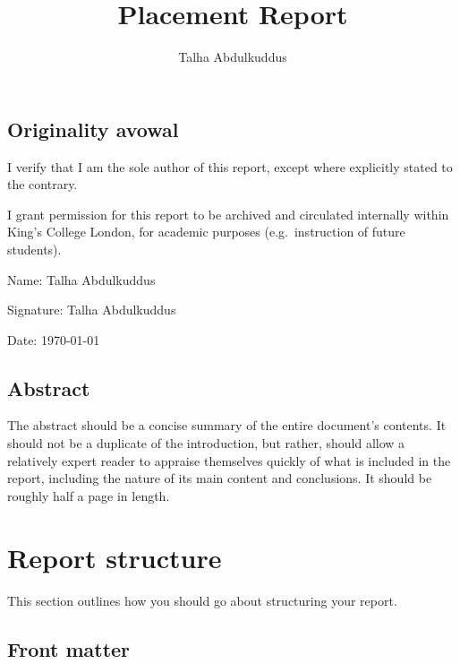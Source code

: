 \documentclass[british,12pt,a4paper]{report}
\begin{document}
\title{Placement Report}
\author{Talha Abdulkuddus}


\setcounter{page}{2} %

\vfill

\section*{Originality avowal}

I verify that I am the sole author of this report, except where explicitly
stated to the contrary.

I grant permission for this report to be archived and circulated
internally within King's College London, for academic purposes
(e.g.\ instruction of future students).

\bigskip

Name: Talha Abdulkuddus

\medskip

Signature:
{}
{Talha Abdulkuddus}

\medskip

Date: \today

\vfill

\section*{Abstract}

The abstract should be a concise summary of the entire document's contents.
It should not be a duplicate of the introduction, but rather,
should allow a relatively expert reader to appraise themselves quickly
of what is included in the report,
including the nature of its main content and conclusions.
It should be roughly half a page in length.

\vfill

\tableofcontents



\chapter{Report structure}

This section outlines how you should go about structuring your report.

\section{Front matter}
\end{document}
